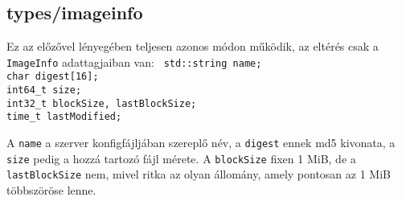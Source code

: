 \documentclass[fleqn,10pt,a4paper,titlepage]{article}
\begin{document}
  \subsection{types/imageinfo}
  Ez az előzővel lényegében teljesen azonos módon működik, az eltérés csak a \texttt{ImageInfo} adattagjaiban van:
  \texttt{
    std::string name;\\
    char  digest[16];\\
    int64\_t size;\\
    int32\_t blockSize, lastBlockSize;\\
    time\_t lastModified;    
  }

  A \texttt{name} a szerver konfigfájljában szereplő név, a \texttt{digest} ennek md5 kivonata, a \texttt{size} pedig a
  hozzá tartozó fájl mérete. A \texttt{blockSize} fixen 1 MiB, de a \texttt{lastBlockSize} nem, mivel ritka az olyan
  állomány, amely pontosan az 1 MiB többszöröse lenne.
  
\end{document}
